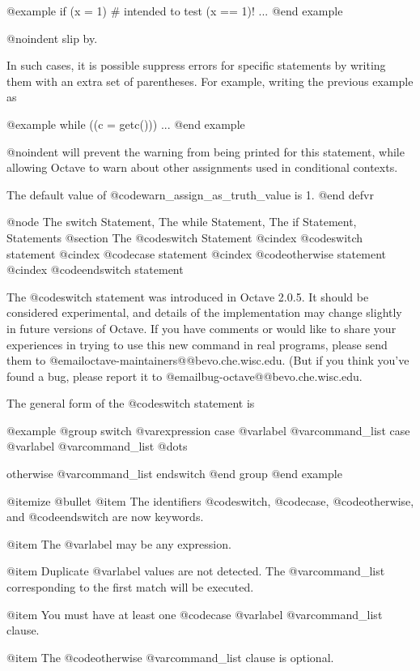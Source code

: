 @example
if (x = 1)  # intended to test (x == 1)!
  ...
@end example

@noindent
slip by.

In such cases, it is possible suppress errors for specific statements by
writing them with an extra set of parentheses.  For example, writing the
previous example as

@example
while ((c = getc()))
  ...
@end example

@noindent
will prevent the warning from being printed for this statement, while
allowing Octave to warn about other assignments used in conditional
contexts.

The default value of @code{warn_assign_as_truth_value} is 1.
@end defvr

@node The switch Statement, The while Statement, The if Statement, Statements
@section The @code{switch} Statement
@cindex @code{switch} statement
@cindex @code{case} statement
@cindex @code{otherwise} statement
@cindex @code{endswitch} statement

The @code{switch} statement was introduced in Octave 2.0.5.  It should
be considered experimental, and details of the implementation may change
slightly in future versions of Octave.  If you have comments or would
like to share your experiences in trying to use this new command in real
programs, please send them to
@email{octave-maintainers@@bevo.che.wisc.edu}.  (But if you think you've
found a bug, please report it to @email{bug-octave@@bevo.che.wisc.edu}.

The general form of the @code{switch} statement is

@example
@group
switch @var{expression}
  case @var{label}
    @var{command_list}
  case @var{label}
    @var{command_list}
  @dots{}

  otherwise
    @var{command_list}
endswitch
@end group
@end example

@itemize @bullet
@item
The identifiers @code{switch}, @code{case}, @code{otherwise}, and
@code{endswitch} are now keywords. 

@item
The @var{label} may be any expression.

@item
Duplicate @var{label} values are not detected.  The @var{command_list}
corresponding to the first match will be executed.

@item
You must have at least one @code{case @var{label} @var{command_list}}
clause.

@item
The @code{otherwise @var{command_list}} clause is optional.

